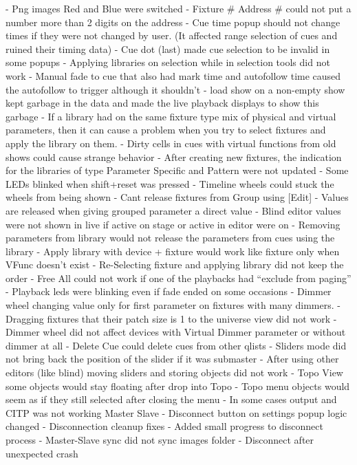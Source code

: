 \documentclass[
]{article}
\begin{document}
- Png images Red and Blue were switched
- Fixture \# Address \# could not put a number more than 2 digits on the address
- Cue time popup should not change times if they were not changed by user. (It affected range selection of cues and ruined their timing data)
- Cue dot (last) made cue selection to be invalid in some popups
- Applying libraries on selection while in selection tools did not work
- Manual fade to cue that also had mark time and autofollow time caused the autofollow to trigger although it shouldn't
- load show on a non-empty show kept garbage in the data and made the live playback displays to show this garbage
- If a library had on the same fixture type mix of physical and virtual parameters, then it can cause a problem when you try to select fixtures and apply the library on them.
- Dirty cells in cues with virtual functions from old shows could cause strange behavior
- After creating new fixtures, the indication for the libraries of type Parameter Specific and Pattern were not updated
- Some LEDs blinked when shift+reset was pressed
- Timeline wheels could stuck the wheels from being shown
- Cant release fixtures from Group using {[}Edit{]}
- Values are released when giving grouped parameter a direct value
- Blind editor values were not shown in live if active on stage or active in editor were on
- Removing parameters from library would not release the parameters from cues using the library
- Apply library with device + fixture would work like fixture only when VFunc doesn't exist
- Re-Selecting fixture and applying library did not keep the order
- Free All could not work if one of the playbacks had ``exclude from paging''
- Playback leds were blinking even if fade ended on some occasions
- Dimmer wheel changing value only for first parameter on fixtures with many dimmers.
- Dragging fixtures that their patch size is 1 to the universe view did not work
- Dimmer wheel did not affect devices with Virtual Dimmer parameter or without dimmer at all
- Delete Cue could delete cues from other qlists
- Sliders mode did not bring back the position of the slider if it was submaster
- After using other editors (like blind) moving sliders and storing objects did not work
- Topo View some objects would stay floating after drop into Topo
- Topo menu objects would seem as if they still selected after closing the menu
- In some cases output and CITP was not working
Master Slave
- Disconnect button on settings popup logic changed
- Disconnection cleanup fixes
- Added small progress to disconnect process
- Master-Slave sync did not sync images folder
- Disconnect after unexpected crash
\end{document}
